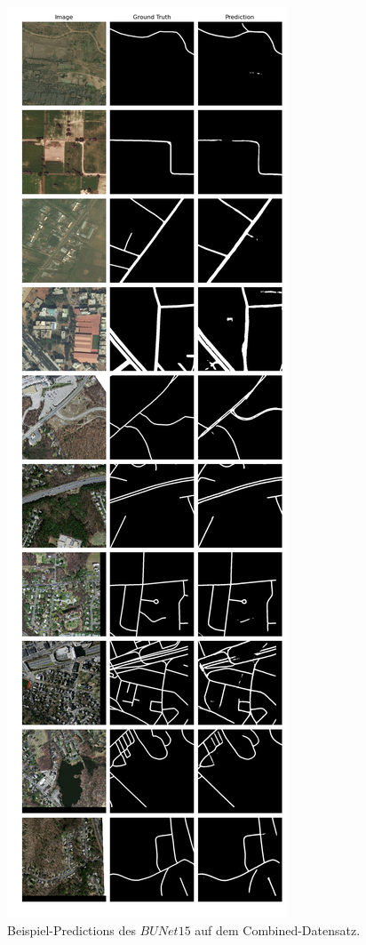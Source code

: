 \begin{figure}
	\centering
	\includegraphics[width=.41\textwidth]{Bilder/Samples-Combined/bunet15.png}
	\caption{Beispiel-Predictions des $BUNet15$ auf dem Combined-Datensatz.}
	\label{fig:combined-samples-bunet15}
\end{figure}

